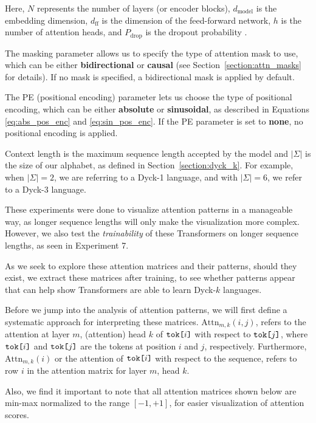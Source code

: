 Here, $N$ represents the number of layers (or encoder blocks), $d_{\text{model}}$ is the embedding dimension, $d_{\text{ff}}$ is the dimension of the feed-forward network, $h$ is the number of attention heads, and $P_{\text{drop}}$ is the dropout probability \cite{dropout}. 

The masking parameter allows us to specify the type of attention mask to use, which can be either \textbf{bidirectional} or \textbf{causal} (see Section~\ref{section:attn_masks} for details). If no mask is specified, a bidirectional mask is applied by default.

The PE (positional encoding) parameter lets us choose the type of positional encoding, which can be either \textbf{absolute} or \textbf{sinusoidal}, as described in Equations \ref{eq:abs_pos_enc} and \ref{eq:sin_pos_enc}. If the PE parameter is set to \textbf{none}, no positional encoding is applied.

Context length is the maximum sequence length accepted by the model and $|\Sigma|$ is the size of our alphabet, as defined in Section~\ref{section:dyck_k}. For example, when $|\Sigma| = 2$, we are referring to a Dyck-1 language, and with $|\Sigma| = 6$, we refer to a Dyck-3 language.

These experiments were done to visualize attention patterns in a manageable way, as longer sequence lengths will only make the visualization more complex. However, we also test the \emph{trainability} of these Transformers on longer sequence lengths, as seen in Experiment 7.

As we seek to explore these attention matrices and their patterns, should they exist, we extract these matrices after training, to see whether patterns appear that can help show Transformers are able to learn Dyck-$k$ languages.

Before we jump into the analysis of attention patterns, we will first define a systematic approach for interpreting these matrices. $\text{Attn}_{m, k}(i, j)$, refers to the attention at layer $m$, (attention) head $k$ of $\verb|tok[|i\verb|]|$ with respect to $\verb|tok[|j\verb|]|$, where $\verb|tok[|i\verb|]|$  and $\verb|tok[|j\verb|]|$ are the tokens at position $i$ and $j$, respectively. Furthermore, $\text{Attn}_{m, k}(i)$ or the attention of $\verb|tok[|i\verb|]|$ with respect to the sequence, refers to row $i$ in the attention matrix for layer $m$, head $k$.

Also, we find it important to note that all attention matrices shown below are min-max normalized to the range $[-1, +1]$, for easier visualization of attention scores.



